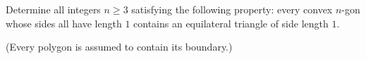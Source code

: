 Determine all integers $n \geq 3$ satisfying the following property: every convex $n$-gon whose sides all have length $1$ contains an equilateral triangle of side length $1$.

(Every polygon is assumed to contain its boundary.)
